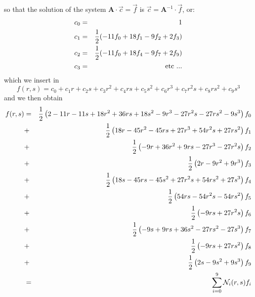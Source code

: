 so that the solution of the system ${\bm A}\cdot \vec{c}=\vec{f}$ is
$\vec{c} = {\bm A}^{-1}\cdot \vec{f}$, or:
\begin{eqnarray}
c_0 &=& 1   \nonumber\\
c_1 &=& \frac12 (-11 f_0 + 18 f_1 -9 f_2 + 2f_3 ) \nonumber\\
c_2 &=& \frac12 (-11f_0 + 18f_4 -9 f_7 + 2f_9) \nonumber\\
c_3 &=& \text{etc ...}
\end{eqnarray}
which we insert in 
\[
f(r,s) = c_0 + c_1 r+ c_2 s + c_3r^2 + c_4 rs + c_5 s^2
+c_6 r^3 + c_7 r^2s + c_8 rs^2 + c_9 s^3
\]
and we then obtain
\begin{eqnarray}
f(r,s) 
&=&\frac12\left(2-11r-11s+18r^2+36rs+18s^2-9r^3-27r^2s-27rs^2-9s^3 \right) f_0 \nonumber\\
&+&\frac12\left(18r-45r^2-45rs +27r^3 +54r^2s+27rs^2\right) f_1\nonumber\\
&+&\frac12\left( -9r+36r^2+9rs -27r^3 -27r^2s \right) f_2\nonumber\\
&+&\frac12\left( 2r-9r^2+9r^3 \right) f_3\nonumber\\
&+&\frac12\left( 18s -45rs-45s^2+27r^2s+54rs^2+27s^3\right) f_4\nonumber\\
&+&\frac12\left( 54rs-54r^2s-54rs^2  \right) f_5\nonumber\\
&+&\frac12\left( -9rs+27r^2s  \right) f_6\nonumber\\
&+&\frac12\left( -9s+9rs+36s^2-27rs^2-27s^3  \right) f_7\nonumber\\
&+&\frac12\left( -9rs+27rs^2  \right) f_8\nonumber\\
&+&\frac12\left( 2s-9s^2+9s^3  \right) f_9 \nonumber \\
&=& \sum_{i=0}^9 {\mathcal{N}}_i(r,s) f_i \nonumber
\end{eqnarray}


